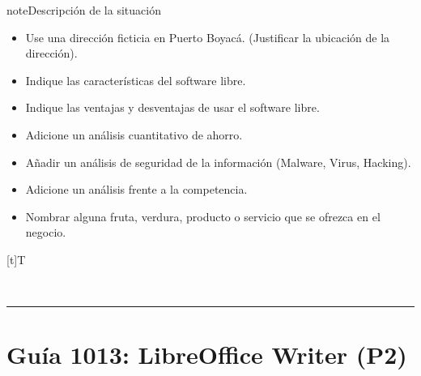 \documentclass[letterpaper,10pt,spanish]{sphinxmanual}
\let\sphinxpxdimen\pdfpxdimen\else\newdimen\sphinxpxdimen
\begin{document}
\begin{sphinxadmonition}{note}{Descripción de la situación}
\begin{enumerate}
\begin{itemize}
\item {} 
\sphinxAtStartPar
Use una dirección ficticia en Puerto Boyacá. (Justificar la ubicación de la dirección).

\item {} 
\sphinxAtStartPar
Indique las características del software libre.

\item {} 
\sphinxAtStartPar
Indique las ventajas y desventajas de usar el software libre.

\item {} 
\sphinxAtStartPar
Adicione un análisis cuantitativo de ahorro.

\item {} 
\sphinxAtStartPar
Añadir un análisis de seguridad de la información (Malware, Virus, Hacking).

\item {} 
\sphinxAtStartPar
Adicione un análisis frente a la competencia.

\item {} 
\sphinxAtStartPar
Nombrar alguna fruta, verdura, producto o servicio que se ofrezca en el negocio.

\end{itemize}


\begin{savenotes}\sphinxattablestart
\sphinxthistablewithglobalstyle
\centering
\begin{tabulary}{\linewidth}[t]{T}
\sphinxtoprule
\sphinxtableatstartofbodyhook

\begin{sphinxfigure-in-table}
\centering
\capstart
\noindent\sphinxincludegraphics[width=400\sphinxpxdimen]{{image21}.png}
\label{\detokenize{1_guias/10ofimatica/G1012:id60}}\end{sphinxfigure-in-table}\relax
\\
\sphinxbottomrule
\end{tabulary}
\sphinxtableafterendhook\par
\sphinxattableend\end{savenotes}

\end{enumerate}
\end{sphinxadmonition}


\bigskip\hrule\bigskip


\sphinxstepscope


\section{Guía 1013: LibreOffice Writer (P2)}
\label{\detokenize{1_guias/10ofimatica/G1013:guia-1013-libreoffice-writer-p2}}\label{\detokenize{1_guias/10ofimatica/G1013::doc}}
\end{document}
